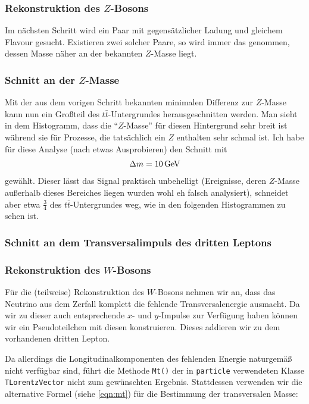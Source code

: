 \subsubsection{Rekonstruktion des $Z$-Bosons}
Im nächsten Schritt wird ein Paar mit gegensätzlicher Ladung und gleichem
Flavour gesucht. Existieren zwei solcher Paare, so wird immer das genommen,
dessen Masse näher an der bekannten $Z$-Masse liegt.


\subsubsection{Schnitt an der $Z$-Masse}
Mit der aus dem vorigen Schritt bekannten minimalen Differenz zur $Z$-Masse kann
nun ein Großteil des $t\bar{t}$-Untergrundes herausgeschnitten werden. Man sieht
in dem Histogramm, dass die "`$Z$-Masse"' für diesen Hintergrund sehr breit ist
während sie für Prozesse, die tatsächlich ein $Z$ enthalten sehr schmal ist. Ich
habe für diese Analyse (nach etwas Ausprobieren) den Schnitt mit
\begin{align}
  \Delta m = \unit[10]{GeV}
\end{align}
gewählt. Dieser lässt das Signal praktisch unbehelligt (Ereignisse, deren
$Z$-Masse außerhalb dieses Bereiches liegen wurden wohl eh falsch analysiert),
schneidet aber etwa $\frac{3}{4}$ des $t\bar{t}$-Untergrundes weg, wie in den
folgenden Histogrammen zu sehen ist.


\subsubsection{Schnitt an dem Transversalimpuls des dritten Leptons}

\subsubsection{Rekonstruktion des $W$-Bosons}
Für die (teilweise) Rekonstruktion des $W$-Bosons nehmen wir an, dass das
Neutrino aus dem Zerfall komplett die fehlende Transversalenergie ausmacht. Da
wir zu dieser auch entsprechende $x$- und $y$-Impulse zur Verfügung haben können
wir ein Pseudoteilchen mit diesen konstruieren. Dieses addieren wir zu dem
vorhandenen dritten Lepton.

Da allerdings die Longitudinalkomponenten des fehlenden Energie naturgemäß nicht
verfügbar sind, führt die Methode \lstinline'Mt()' der in \lstinline'particle'
verwendeten Klasse \lstinline'TLorentzVector' nicht zum gewünschten Ergebnis.
Stattdessen verwenden wir die alternative Formel (siehe \ref{eqn:mt}) für die
Bestimmung der transversalen Masse:

